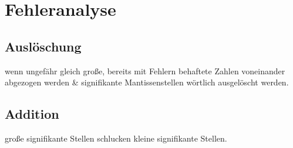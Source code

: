\section{Fehleranalyse}
\subsection{Auslöschung}
wenn ungefähr gleich große, bereits mit Fehlern behaftete Zahlen voneinander abgezogen werden \& signifikante Mantissenstellen wörtlich ausgelöscht werden.
\subsection{Addition}
große signifikante Stellen schlucken kleine signifikante Stellen.